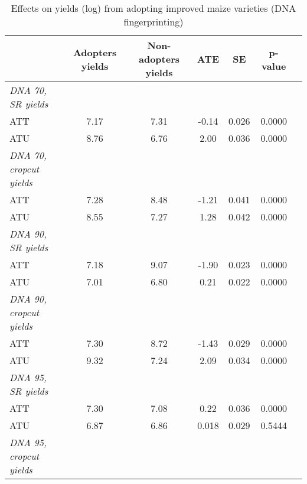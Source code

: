 \begin{table}[htbp]
\centering
\hspace*{-1.2cm}
\begin{threeparttable}
\caption{Effects on yields (log) from adopting improved maize varieties (DNA fingerprinting)}
\label{tab:switching}
\begin{tabular}{l cccccc}
\hline
\hline
            &Adopters yields&Non-adopters yields&        ATE&          SE&     p-value\\
\hline
\textit{DNA 70, SR yields}&            &            &            &            &            \\
ATT         &        7.17&        7.31&       -0.14&       0.026&      0.0000\\
%
%
%
ATU         &        8.76&        6.76&        2.00&       0.036&      0.0000\\
%
%
%
\textit{DNA 70, cropcut yields}&            &            &            &            &            \\
ATT         &        7.28&        8.48&       -1.21&       0.041&      0.0000\\
%
%
%
ATU         &        8.55&        7.27&        1.28&       0.042&      0.0000\\
%
%
%
\textit{DNA 90, SR yields}&            &            &            &            &            \\
ATT         &        7.18&        9.07&       -1.90&       0.023&      0.0000\\
%
%
%
ATU         &        7.01&        6.80&        0.21&       0.022&      0.0000\\
%
%
%
\textit{DNA 90, cropcut yields}&            &            &            &            &            \\
ATT         &        7.30&        8.72&       -1.43&       0.029&      0.0000\\
%
%
%
ATU         &        9.32&        7.24&        2.09&       0.034&      0.0000\\
%
%
%
\textit{DNA 95, SR yields}&            &            &            &            &            \\
ATT         &        7.30&        7.08&        0.22&       0.036&      0.0000\\
%
%
%
ATU         &        6.87&        6.86&       0.018&       0.029&      0.5444\\
%
%
%
\textit{DNA 95, cropcut yields}&            &            &            &            &            \\

\end{tabular}
\end{threeparttable}
\end{table}
